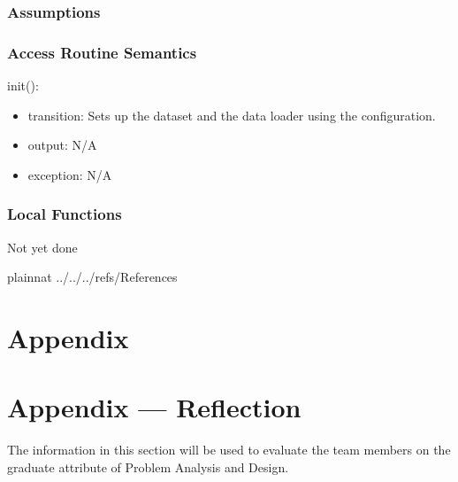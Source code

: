 \documentclass[12pt, titlepage]{article}
\begin{document}
\subsubsection{Assumptions}



\subsubsection{Access Routine Semantics}


\noindent init():
\begin{itemize}
\item transition: Sets up the dataset and the data loader using the configuration.
\item output: N/A
\item exception: N/A
\end{itemize}

\subsubsection{Local Functions}

Not yet done

\newpage

 {plainnat}
 {../../../refs/References}

\newpage

\section{Appendix} \label{Appendix}


\newpage{}

\section*{Appendix --- Reflection}


The information in this section will be used to evaluate the team members on the
graduate attribute of Problem Analysis and Design.


\end{document}

